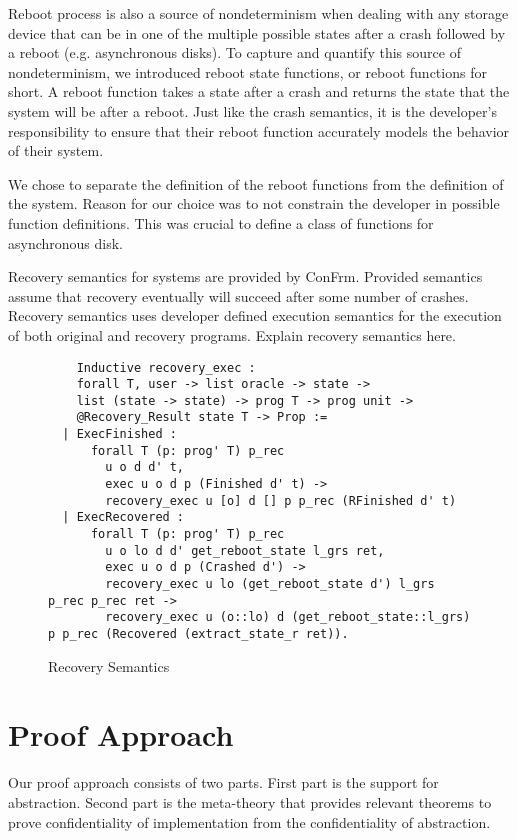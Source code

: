 Reboot process is also a source of nondeterminism when dealing with any storage device that can be in one of the multiple possible states after a crash followed by a reboot (e.g. asynchronous disks). To capture and quantify this source of nondeterminism, we introduced reboot state functions, or reboot functions for short. A reboot function takes a state after a crash and returns the state that the system will be after a reboot. Just like the crash semantics, it is the developer's responsibility to ensure that their reboot function accurately models the behavior of their system.

We chose to separate the definition of the reboot functions from the definition of the system. Reason for our choice was to not constrain the developer in possible function definitions. This was crucial to define a class of functions for asynchronous disk.

Recovery semantics for systems are provided by ConFrm. Provided semantics assume that recovery eventually will succeed after some number of crashes. Recovery semantics uses developer defined execution semantics for the execution of both original and recovery programs. 
{\color{red} Explain recovery semantics here.}

\begin{figure}[ht]
    \centering
    \begin{verbatim}
    Inductive recovery_exec :
    forall T, user -> list oracle -> state -> 
    list (state -> state) -> prog T -> prog unit -> 
    @Recovery_Result state T -> Prop :=
  | ExecFinished :
      forall T (p: prog' T) p_rec
        u o d d' t,
        exec u o d p (Finished d' t) ->
        recovery_exec u [o] d [] p p_rec (RFinished d' t)
  | ExecRecovered :
      forall T (p: prog' T) p_rec
        u o lo d d' get_reboot_state l_grs ret,
        exec u o d p (Crashed d') ->
        recovery_exec u lo (get_reboot_state d') l_grs p_rec p_rec ret ->
        recovery_exec u (o::lo) d (get_reboot_state::l_grs) p p_rec (Recovered (extract_state_r ret)).

    \end{verbatim}
    \caption{Recovery Semantics}
    \label{fig:Recovery_semantics}
\end{figure}

\section{Proof Approach}
Our proof approach consists of two parts. First part is the support for abstraction. Second part is the meta-theory that provides relevant theorems to prove confidentiality of implementation from the confidentiality of abstraction.


